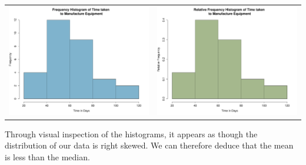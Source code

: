 \begin{example}
\begin{center}
\begin{tabular}{cc}
\includegraphics[scale=0.27]{Section2/freq_hist.pdf}	&	\includegraphics[scale=0.27]{Section2/rel_freq_hist.pdf}
\end{tabular}
\end{center}

Through visual inspection of the histograms, it appears as though the distribution of our data is right skewed. We can therefore deduce that the mean is less than the median.

\end{example}

